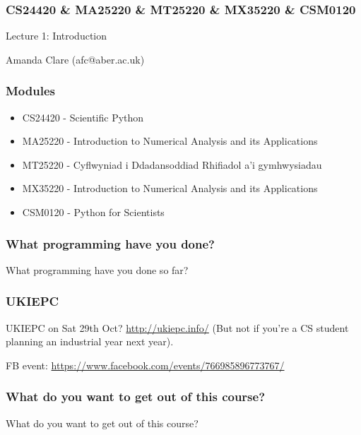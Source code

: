 \documentclass{beamer}
\begin{document}
\begin{frame}
\frametitle{CS24420 \& MA25220 \& MT25220 \& MX35220 \& CSM0120}

\begin{center}
\begin{huge}
Lecture 1: Introduction 
\end{huge}
\bigskip

Amanda Clare (afc@aber.ac.uk)

\end{center}
\end{frame}

\begin{frame}
\frametitle{Modules}
\begin{itemize}
\item CS24420 - Scientific Python
\item MA25220 - Introduction to Numerical Analysis and its
  Applications
\item MT25220 - Cyflwyniad i Ddadansoddiad Rhifiadol a'i gymhwysiadau
\item MX35220 - Introduction to Numerical Analysis and its Applications
\item CSM0120 - Python for Scientists
\end{itemize}
\end{frame}

\begin{frame}
\frametitle{What programming have you done?}

What programming have you done so far? 

\end{frame}

\begin{frame}
\frametitle{UKIEPC}

UKIEPC on Sat 29th Oct? \url{http://ukiepc.info/} (But not if you're
a CS student planning an industrial year next year).

\bigskip

FB event: \url{https://www.facebook.com/events/766985896773767/}

\end{frame}


\begin{frame}
\frametitle{What do you want to get out of this course?}

What do you want to get out of this course?

\end{frame}
\end{document}
